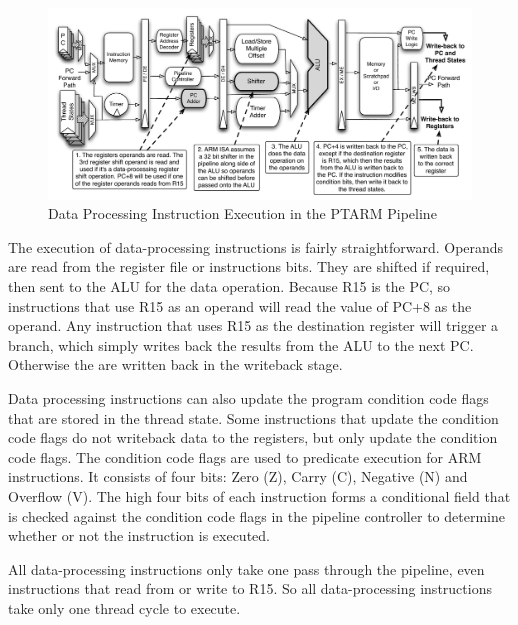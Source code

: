 \begin{figure}[h]
  
  \begin{center}
    \includegraphics[scale=.54]{figs/data_processing_pipeline_implementation}
  \end{center}
  \vspace{-3mm}
  \caption{Data Processing Instruction Execution in the PTARM Pipeline}
  \label{fig:data_processing_pipeline_implementation}
\end{figure}

The execution of data-processing instructions is fairly straightforward.
Operands are read from the register file or instructions bits.
They are shifted if required, then sent to the ALU for the data operation.  
Because R15 is the PC, so instructions that use R15 as an operand will read the value of PC+8 as the operand. 
Any instruction that uses R15 as the destination register will trigger a branch, which simply writes back the results from the ALU to the next PC.
Otherwise the are written back in the writeback stage. 

Data processing instructions can also update the program condition code flags that are stored in the thread state. 
Some instructions that update the condition code flags do not writeback data to the registers, but only update the condition code flags.
The condition code flags are used to predicate execution for ARM instructions.
It consists of four bits: Zero (Z), Carry (C), Negative (N) and Overflow (V). 
The high four bits of each instruction forms a conditional field that is checked against the condition code flags in the pipeline controller to determine whether or not the instruction is executed. 

All data-processing instructions only take one pass through the pipeline, even instructions that read from or write to R15.
So all data-processing instructions take only one thread cycle to execute. 

